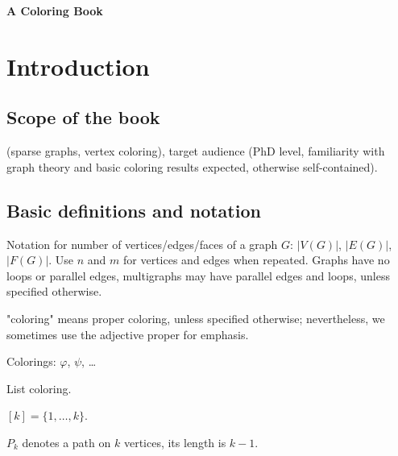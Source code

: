 \documentclass[12pt,twoside,openright,a4paper]{book}
\begin{document}
\pagestyle{empty}
\begin{titlepage}

\begin{center}

\vspace{10cm}

{\large\bf A Coloring Book}

\end{center}
\end{titlepage}

\newpage

\pagestyle{plain}
\tableofcontents

\newpage

\pagestyle{headings}
\setcounter{page}{1}

\chapter{Introduction}

\section{Scope of the book}

(sparse graphs, vertex coloring), target audience (PhD level,
familiarity with graph theory and basic coloring results expected, otherwise self-contained).

\section{Basic definitions and notation}


Notation for number of vertices/edges/faces of a graph $G$:
$|V(G)|$, $|E(G)|$, $|F(G)|$.
Use $n$ and $m$ for vertices and edges when repeated.
Graphs have no loops or parallel edges, multigraphs may have parallel edges and loops, unless specified otherwise.

"coloring" means proper coloring, unless specified otherwise; nevertheless, we sometimes use the adjective proper
for emphasis.

Colorings: $\varphi$, $\psi$, \ldots

List coloring.

$[k]=\{1,\ldots,k\}$.

$P_k$ denotes a path on $k$ vertices, its length is $k-1$.
\end{document}
